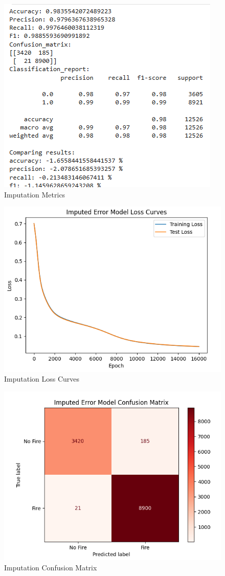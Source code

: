 \documentclass[conference]{IEEEtran}
\begin{document}
\begin{figure}
    \centering
    \includegraphics[width=0.75\linewidth]{images/imputationmetric.png}
    \caption{Imputation Metrics}
    \label{fig:5.0}
\end{figure}
\begin{figure}
    \centering
    \includegraphics[width=0.75\linewidth]{images/ImputationLC.png}
    \caption{Imputation Loss Curves}
    \label{fig:5.1}
\end{figure}

\begin{figure}
    \centering
    \includegraphics[width=0.75\linewidth]{images/ImputationCM.png}
    \caption{Imputation Confusion Matrix}
    \label{fig:5.2}
\end{figure}
\end{document}
